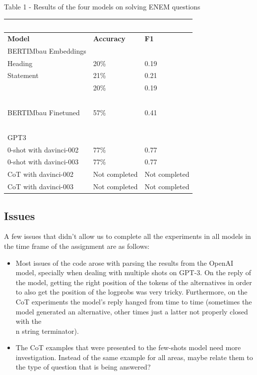 \documentclass{article}
\begin{document}
\begin{center}
\caption{Table 1 - Results of the four models on solving ENEM questions}
\begin{tabular}{ | l | l | l | }
\hline
	\  & \  & \  \\ \hline
	\textbf{Model} & \textbf{Accuracy} & \textbf{F1} \\ \hline
	  BERTIMbau Embeddings  \\ \hline
	     Heading & 20\% & 0.19 \\ \hline
	     Statement & 21\% & 0.21 \\ \hline
	     [CLS] & 20\% & 0.19 \\ \hline
	\  & \  & \  \\ \hline
	  BERTIMbau Finetuned & 57\% & 0.41 \\ \hline
	\  & \  & \  \\ \hline
	  GPT3 & \  & \  \\ \hline
	    0-shot with davinci-002 & 77\% & 0.77 \\ \hline
	    0-shot with davinci-003 & 77\% & 0.77 \\ \hline
	    CoT with davinci-002 & Not completed & Not completed \\ \hline
	    CoT with davinci-003 & Not completed & Not completed \\ \hline
\end{tabular}
\end{center}

\subsection{Issues}

A few issues that didn't allow us to complete all the experiments in all models in the time frame of the assignment are as follows:

\vspace{-0.05cm}
\begin{itemize}%
 \item Most issues of the code arose with parsing the results from the OpenAI model, specially when dealing with multiple shots on GPT-3. On the reply of the model, getting the right position of the tokens of the alternatives in order to also get the position of the logprobs was very tricky. Furthermore, on the CoT experiments the model's reply hanged from time to time (sometimes the model generated an alternative, other times just a latter not properly closed with the \\n string terminator).
 \vspace{-0.25cm}
 \item The CoT examples that were presented to the few-shots model need more investigation. Instead of the same example for all areas, maybe relate them to the type of question that is being answered?
\end{itemize}
\vspace{-0.35cm}
\end{document}

